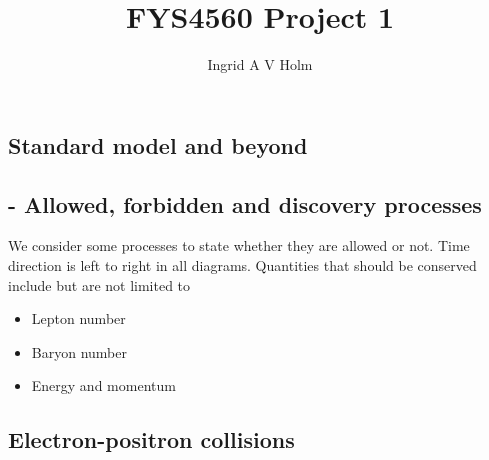 \documentclass[11pt]{article}
\begin{document}
\title{FYS4560 Project 1}
\author{Ingrid A V Holm}
\maketitle

\begin{multicols}{2}
\section{Standard model and beyond}
\subsection*{- Allowed, forbidden and discovery processes}

\begin{flushleft}
We consider some processes to state whether they are allowed or not. Time direction is left to right in all diagrams. Quantities that should be conserved include but are not limited to
\begin{itemize}
\item Lepton number
\item Baryon number
\item Energy and momentum
\end{itemize}
\end{flushleft}

\subsection*{Electron-positron collisions}


\end{multicols}
\end{document}
